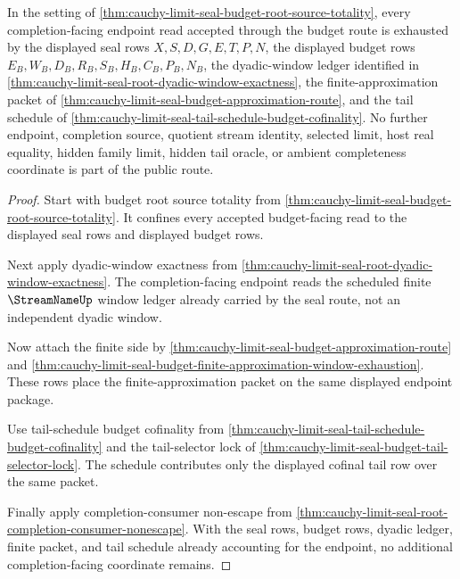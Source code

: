 \begin{theorem}
\label{thm:cauchy-limit-seal-budget-source-endpoint-exhaustion}
In the setting of \autoref{thm:cauchy-limit-seal-budget-root-source-totality}, every completion-facing endpoint read accepted through the budget route is exhausted by the displayed seal rows $X,S,D,G,E,T,P,N$, the displayed budget rows $E_B,W_B,D_B,R_B,S_B,H_B,C_B,P_B,N_B$, the dyadic-window ledger identified in \autoref{thm:cauchy-limit-seal-root-dyadic-window-exactness}, the finite-approximation packet of \autoref{thm:cauchy-limit-seal-budget-approximation-route}, and the tail schedule of \autoref{thm:cauchy-limit-seal-tail-schedule-budget-cofinality}. No further endpoint, completion source, quotient stream identity, selected limit, host real equality, hidden family limit, hidden tail oracle, or ambient completeness coordinate is part of the public route.
\end{theorem}
\begin{proof}
Start with budget root source totality from \autoref{thm:cauchy-limit-seal-budget-root-source-totality}. It confines every accepted budget-facing read to the displayed seal rows and displayed budget rows.

Next apply dyadic-window exactness from \autoref{thm:cauchy-limit-seal-root-dyadic-window-exactness}. The completion-facing endpoint reads the scheduled finite $\StreamNameUp$ window ledger already carried by the seal route, not an independent dyadic window.

Now attach the finite side by \autoref{thm:cauchy-limit-seal-budget-approximation-route} and \autoref{thm:cauchy-limit-seal-budget-finite-approximation-window-exhaustion}. These rows place the finite-approximation packet on the same displayed endpoint package.

Use tail-schedule budget cofinality from \autoref{thm:cauchy-limit-seal-tail-schedule-budget-cofinality} and the tail-selector lock of \autoref{thm:cauchy-limit-seal-budget-tail-selector-lock}. The schedule contributes only the displayed cofinal tail row over the same packet.

Finally apply completion-consumer non-escape from \autoref{thm:cauchy-limit-seal-root-completion-consumer-nonescape}. With the seal rows, budget rows, dyadic ledger, finite packet, and tail schedule already accounting for the endpoint, no additional completion-facing coordinate remains.
\end{proof}

